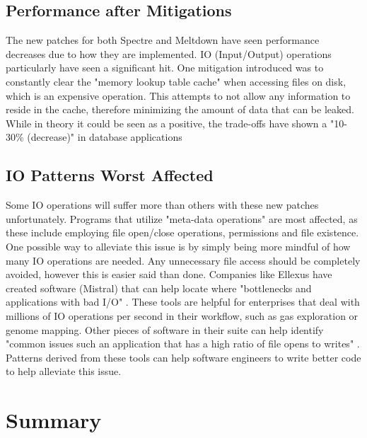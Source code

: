 \documentclass[conference]{IEEEtran}
\begin{document}
\subsection{Performance after Mitigations}

The new patches for both Spectre and Meltdown have seen performance decreases due to how they are implemented.
IO (Input/Output) operations particularly have seen a significant hit.
One mitigation introduced was to constantly clear the "memory lookup table cache" when accessing files on disk, which is an expensive operation.
This attempts to not allow any information to reside in the cache, therefore minimizing the amount of data that can be leaked.
While in theory it could be seen as a positive, the trade-offs have shown a "10-30\% (decrease)" in database applications \autocite[4]{ijmsit526310}

\subsection{IO Patterns Worst Affected}

Some IO operations will suffer more than others with these new patches unfortunately.
Programs that utilize "meta-data operations" are most affected, as these include employing file open/close operations, permissions and file existence.
One possible  way to alleviate this issue is by simply being more mindful of how many IO operations are needed.
Any unnecessary file access should be completely avoided, however this is easier said than done.
Companies like Ellexus have created software (Mistral) that can help locate where "bottlenecks and applications with bad I/O" \autocite[5]{SpectrePerformance}.
These tools are helpful for enterprises that deal with millions of IO operations per second in their workflow, such as gas exploration or genome mapping.
Other pieces of software in their suite can help identify "common issues such an application that has a high ratio of file opens to writes" \autocite[5]{SpectrePerformance}.
Patterns derived from these tools can help software engineers to write better code to help alleviate this issue.

\section{Summary}
\end{document}
